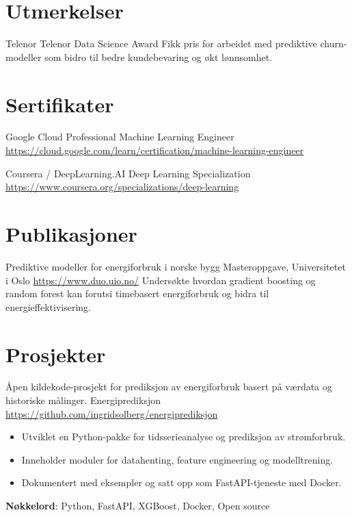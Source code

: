 \documentclass[a4paper, serif, 10pt]{moderncv}
\begin{document}
\section{Utmerkelser}

        {Telenor}
        {Telenor Data Science Award}
        {}
        {}
        {Fikk pris for arbeidet med prediktive churn-modeller som bidro til bedre kundebevaring og økt lønnsomhet.}
\section{Sertifikater}

        {Google Cloud}
        {Professional Machine Learning Engineer}
        {\url{https://cloud.google.com/learn/certification/machine-learning-engineer}}
        {}
        {}

        {Coursera / DeepLearning.AI}
        {Deep Learning Specialization}
        {\url{https://www.coursera.org/specializations/deep-learning}}
        {}
        {}
\section{Publikasjoner}

        {Prediktive modeller for energiforbruk i norske bygg}
        {Masteroppgave, Universitetet i Oslo}
        {\url{https://www.duo.uio.no/}}
        {}
        {Undersøkte hvordan gradient boosting og random forest kan forutsi timebasert energiforbruk og bidra til energieffektivisering.}
\section{Prosjekter}

        {Åpen kildekode-prosjekt for prediksjon av energiforbruk basert på værdata og historiske målinger.
}
        {Energiprediksjon}
        {\url{https://github.com/ingridsolberg/energiprediksjon}}
        {}
        {\begin{itemize}
\item Utviklet en Python-pakke for tidsserieanalyse og prediksjon av strømforbruk.
\item Inneholder moduler for datahenting, feature engineering og modelltrening.
\item Dokumentert med eksempler og satt opp som FastAPI-tjeneste med Docker.
\end{itemize}
\textbf{Nøkkelord}: Python, FastAPI, XGBoost, Docker, Open source}
\end{document}

